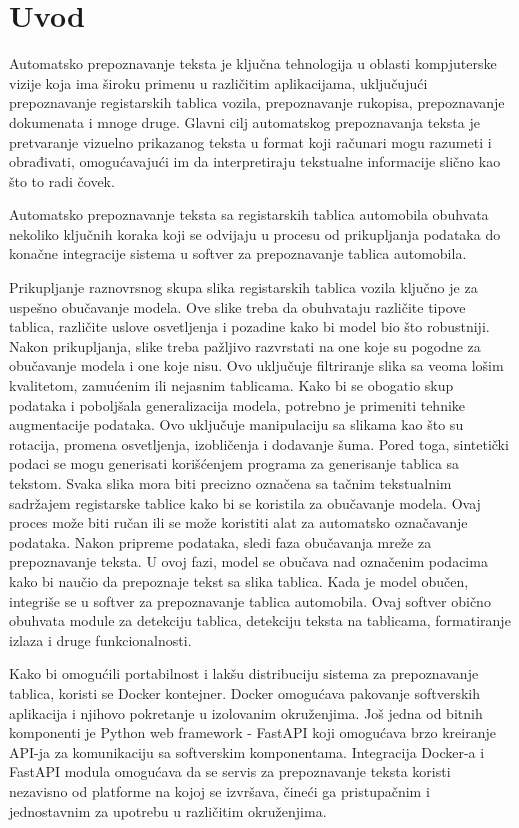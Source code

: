 \documentclass[a4paper,12pt]{article}
\begin{document}
	\section{Uvod}
	Automatsko prepoznavanje teksta je ključna tehnologija u oblasti kompjuterske vizije koja ima široku primenu u različitim aplikacijama, uključujući prepoznavanje registarskih tablica vozila, prepoznavanje rukopisa, prepoznavanje dokumenata i mnoge druge. Glavni cilj automatskog prepoznavanja teksta je pretvaranje vizuelno prikazanog teksta u format koji računari mogu razumeti i obrađivati, omogućavajući im da interpretiraju tekstualne informacije slično kao što to radi čovek.
		
	Automatsko prepoznavanje teksta sa registarskih tablica automobila obuhvata nekoliko ključnih koraka koji se odvijaju u procesu od prikupljanja podataka do konačne integracije sistema u softver za prepoznavanje tablica automobila.
	
	Prikupljanje raznovrsnog skupa slika registarskih tablica vozila ključno je za uspešno obučavanje modela. Ove slike treba da obuhvataju različite tipove tablica, različite uslove osvetljenja i pozadine kako bi model bio što robustniji. Nakon prikupljanja, slike treba pažljivo razvrstati na one koje su pogodne za obučavanje modela i one koje nisu. Ovo uključuje filtriranje slika sa veoma lošim kvalitetom, zamućenim ili nejasnim tablicama. Kako bi se obogatio skup podataka i poboljšala generalizacija modela, potrebno je primeniti tehnike augmentacije podataka. Ovo uključuje manipulaciju sa slikama kao što su rotacija, promena osvetljenja, izobličenja i dodavanje šuma. Pored toga, sintetički podaci se mogu generisati korišćenjem programa za generisanje tablica sa tekstom. Svaka slika mora biti precizno označena sa tačnim tekstualnim sadržajem registarske tablice kako bi se koristila za obučavanje modela. Ovaj proces može biti ručan ili se može koristiti alat za automatsko označavanje podataka. Nakon pripreme podataka, sledi faza obučavanja mreže za prepoznavanje teksta. U ovoj fazi, model se obučava nad označenim podacima kako bi naučio da prepoznaje tekst sa slika tablica. Kada je model obučen, integriše se u softver za prepoznavanje tablica automobila. Ovaj softver obično obuhvata module za detekciju tablica, detekciju teksta na tablicama, formatiranje izlaza i druge funkcionalnosti.
	
	Kako bi omogućili portabilnost i lakšu distribuciju sistema za prepoznavanje tablica, koristi se Docker kontejner. Docker omogućava pakovanje softverskih aplikacija i njihovo pokretanje u izolovanim okruženjima. Još jedna od bitnih komponenti je Python web framework - FastAPI koji omogućava brzo kreiranje API-ja za komunikaciju sa softverskim komponentama. Integracija Docker-a i FastAPI modula omogućava da se servis za prepoznavanje teksta koristi nezavisno od platforme na kojoj se izvršava, čineći ga pristupačnim i jednostavnim za upotrebu u različitim okruženjima.
	\newpage
	
\end{document}

